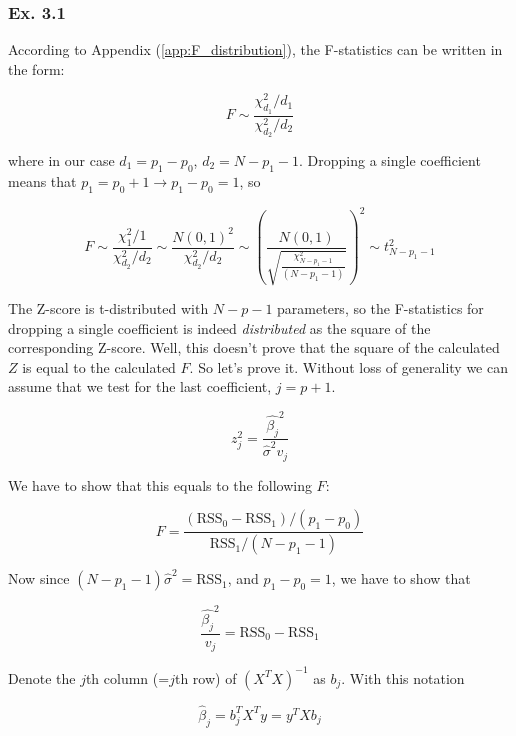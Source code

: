 \documentclass{article}
\begin{document}
\subsubsection{Ex. 3.1}
According to Appendix (\ref{app:F_distribution}), the F-statistics can be written in the form:

\begin{equation}
    F \sim \frac{\chi^2_{d_1}/d_1}{\chi^2_{d_2}/d_2}
\end{equation}

where in our case $d_1 = p_1 - p_0$, $d_2 = N-p_1-1$. Dropping a single coefficient means that $p_1 = p_0 + 1 \to p_1 - p_0 = 1$, so

\begin{equation}
    F \sim \frac{\chi^2_{1}/1}{\chi^2_{d_2}/d_2} \sim \frac{N(0,1)^2}{\chi^2_{d_2}/d_2} \sim \left( \frac{N(0,1)}{\sqrt{\frac{\chi^2_{N-p_1-1}}{(N-p_1-1)}}}\right)^2 \sim t^2_{N-p_1-1}
\end{equation}

The Z-score is t-distributed with $N-p-1$ parameters, so the F-statistics for dropping a single coefficient is indeed \emph{distributed} as the square of the corresponding Z-score. Well, this doesn't prove that the square of the calculated $Z$ is equal to the calculated $F$. So let's prove it. Without loss of generality we can assume that we test for the last coefficient, $j=p+1$.

\begin{equation}
    z^2_j = \frac{\hat{\beta_j}^2}{\hat{\sigma}^2 v_j}
\end{equation}

We have to show that this equals to the following $F$:

\begin{equation}
    F = \frac{(\text{RSS}_0 - \text{RSS}_1)/(p_1 - p_0)}{\text{RSS}_1/(N-p_1-1)}
\end{equation}

Now since $(N-p_1-1)\hat{\sigma}^2 = \text{RSS}_1$, and $p_1 - p_0 = 1$, we have to show that

\begin{equation}
    \frac{\hat{\beta_j}^2}{v_j} = \text{RSS}_0 - \text{RSS}_1
\end{equation}

Denote the $j$th column (=$j$th row) of $(X^TX)^{-1}$ as $b_j$. With this notation

\begin{equation}
    \hat{\beta}_j = b^T_j X^Ty = y^T X b_j
\end{equation}
\end{document}
